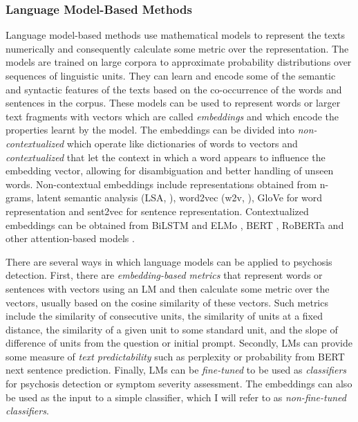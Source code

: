 \subsubsection{Language Model-Based Methods}
Language model-based methods use mathematical models to represent the texts numerically and consequently calculate some metric over the representation. The models are trained on large corpora to approximate probability distributions over sequences of linguistic units. They can learn and encode some of the semantic and syntactic features of the texts based on the co-occurrence of the words and sentences in the corpus. These models can be used to represent words or larger text fragments with vectors which are called \textit{embeddings} and which encode the properties learnt by the model. The embeddings can be divided into \textit{non-contextualized} which operate like dictionaries of words to vectors and \textit{contextualized} that let the context in which a word appears to influence the embedding vector, allowing for disambiguation and better handling of unseen words. Non-contextual embeddings include representations obtained from n-grams, latent semantic analysis (LSA, \citet{landauer1998introduction}), word2vec (w2v, \citet{mikolov2013distributed}), GloVe \citep{pennington2014glove} for word representation and sent2vec \citep{moghadasi2020sent2vec} for sentence representation. Contextualized embeddings can be obtained from BiLSTM and ELMo \citep{peters2017semi}, BERT \citep{devlin2018bert}, RoBERTa \citep{liu2019roberta} and other attention-based models \citep{vaswani2017attention, openai2023gpt4}.

There are several ways in which language models can be applied to psychosis detection. First, there are \textit{embedding-based metrics} that represent words or sentences with vectors using an LM and then calculate some metric over the vectors, usually based on the cosine similarity of these vectors. Such metrics include the similarity of consecutive units, the similarity of units at a fixed distance, the similarity of a given unit to some standard unit, and the slope of difference of units from the question or initial prompt. Secondly, LMs can provide some measure of \textit{text predictability} such as perplexity or probability from BERT next sentence prediction. Finally, LMs can be \textit{fine-tuned} to be used as \textit{classifiers} for psychosis detection or symptom severity assessment. The embeddings can also be used as the input to a simple classifier, which I will refer to as \textit{non-fine-tuned classifiers}.


